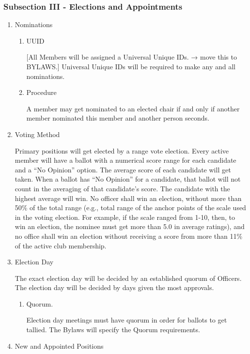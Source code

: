 \documentclass[11pt]{article}
\begin{document}
\subsubsection{Subsection III - Elections and Appointments}
\label{sec:org457eb8b}

\begin{enumerate}
\item Nominations
\label{sec:org039fee2}

\begin{enumerate}
\item UUID
\label{sec:org8038b81}

[All Members will be assigned a Universal Unique IDs. → move this to BYLAWS.]  Universal Unique IDs will be required to make any and all nominations.

\item Procedure
\label{sec:orgc235ecb}

A member may get nominated to an elected chair if and only if another member nominated this member and another person seconds.
\end{enumerate}

\item Voting Method
\label{sec:org8df23f3}

Primary positions will get elected by a range vote election. 
Every active member will have a ballot with a numerical score range for each candidate and a “No Opinion” option. 
The average score of each candidate will get taken. 
When a ballot has “No Opinion” for a candidate, that ballot will not count in the averaging of that candidate’s score. 
The candidate with the highest average will win. 
No officer shall win an election, without more than 50\% of the total range 
(e.g., total range of the anchor points of the scale used in the voting election. For example, if the scale ranged from 1-10, then, to win an election, the nominee must get more than 5.0 in average ratings), 
and no office shall win an election without receiving a score from more than 11\% of the active club membership.

\item Election Day
\label{sec:org8a95ae8}

The exact election day will be decided by an established quorum of Officers. 
The election day will be decided by days given the most approvals.

\begin{enumerate}
\item Quorum.
\label{sec:org93ee783}

Election day meetings must have quorum in order for ballots to get tallied. The Bylaws will specify the Quorum requirements.
\end{enumerate}

\item New and Appointed Positions
\label{sec:orgb48b543}
\end{enumerate}
\end{document}
